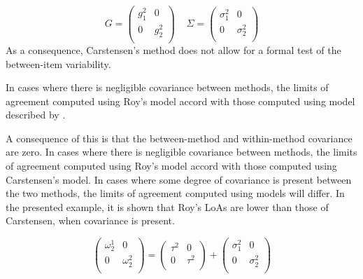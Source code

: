 \documentclass[12pt, a4paper]{report}
\theoremstyle{plain}
\theoremstyle{definition}
\theoremstyle{remark}
\begin{document}
	\[{G} = \left(
	\begin{array}{cc}
	g^2_1  & 0 \\
	0 & g^2_2 \\
	\end{array}
	\right) \;\;\;\; {\Sigma} = \left(
	\begin{array}{cc}
	\sigma^2_1  & 0 \\
	0 & \sigma^2_2 \\
	\end{array}
	\right) \]
As a consequence, Carstensen's method does not allow for a formal test of the between-item variability.
	
	
	

	
	In cases where there is negligible covariance between methods, the limits of agreement computed using Roy's model accord with those computed using model described by \citet{BXC2008}. 
	
	
	
	A consequence of this is that the between-method and within-method covariance are zero. In cases where there is negligible covariance between methods, the limits of agreement computed using Roy's model accord with those computed using Carstensen's model. In cases where some degree of covariance is present between the two methods, the limits of agreement computed using models will differ. In the presented example, it is shown that Roy's LoAs are lower than those of Carstensen, when covariance is present. 
	
	\[\left(\begin{array}{cc}
	\omega^1_2  & 0 \\
	0 & \omega^2_2 \\
	\end{array}  \right)
	=  \left(
	\begin{array}{cc}
	\tau^2  & 0 \\
	0 & \tau^2 \\
	\end{array} \right)+
	\left(
	\begin{array}{cc}
	\sigma^2_1  & 0 \\
	0 & \sigma^2_2 \\
	\end{array}\right)
	\]
	
\end{document}
